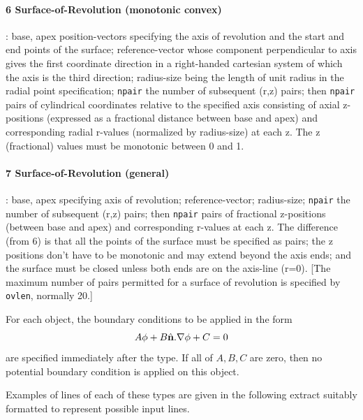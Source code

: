 \documentclass[12pt]{article}
\begin{document}
\paragraph{6 Surface-of-Revolution (monotonic convex)}: base, apex
position-vectors specifying the axis of revolution and the start and
end points of the surface; reference-vector whose component
perpendicular to axis gives the first coordinate direction in a
right-handed cartesian system of which the axis is the third
direction; radius-size being the length of unit radius in the radial
point specification; \verb!npair! the number of subsequent (r,z)
pairs; then \verb!npair! pairs of cylindrical coordinates relative to
the specified axis consisting of axial z-positions (expressed as a
fractional distance between base and apex) and corresponding radial
r-values (normalized by radius-size) at each z. The z (fractional)
values must be monotonic between 0 and 1.

\paragraph{7 Surface-of-Revolution (general)}: base, apex specifying
axis of revolution; reference-vector; radius-size; \verb!npair! the
number of subsequent (r,z) pairs; then \verb!npair! pairs of
fractional z-positions (between base and apex) and corresponding
r-values at each z. The difference (from 6) is that all the points of the
surface must be specified as pairs; the z positions don't have to be
monotonic and may extend beyond the axis ends; and the surface must be
closed unless both ends are on the axis-line (r=0). [The maximum number
of pairs permitted for a surface of revolution is specified by
\verb!ovlen!, normally 20.]

\bigskip
For each object, the boundary conditions to be applied in the form 
$$A\phi + B \hat{\bf n}.\nabla\phi + C =0$$
are specified immediately after the type. If all of $A,B,C$ are zero,
then no potential boundary condition is applied on this object.

Examples of lines of each of these types are given in the following
extract suitably formatted to represent possible input lines.
\end{document}
